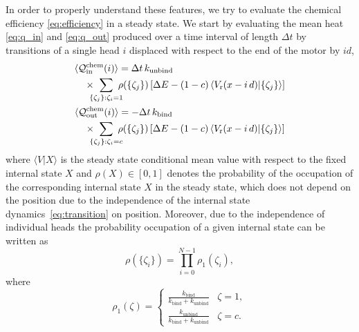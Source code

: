 \documentclass[aps,pre,twocolumn,showpacs,showkeys,superscriptaddress,floatfix]{revtex4-1}
\begin{document}
In order to properly understand these features, 
we try to evaluate the chemical efficiency \eqref{eq:efficiency} in a steady state. 
We start by evaluating the mean heat \eqref{eq:q_in} and \eqref{eq:q_out} produced over a time interval of length $\Delta t$ 
by transitions of a single head $i$ displaced with respect to the end of the motor by $i d$,  
\begin{gather*}
\begin{multlined}[b][.42\textwidth]
\langle \mathcal Q^\text{chem}_\text{in}(i) \rangle 
= \Delta t \, k_\text{unbind} 
\\ \times 
\!\!\!\! \sum\limits_{\{\zeta_j\} : \zeta_i = 1 } \!\!\!\! \rho(\{ \zeta_j \} ) 
\left[ \Delta E - (1-c) \left\langle V_\text{r}(x - i \, d ) \middle| \{ \zeta_j \} \right\rangle \right] 
\end{multlined}
\\
\begin{multlined}[b][.42\textwidth]
\langle \mathcal Q^\text{chem}_\text{out}(i) \rangle 
= - \Delta t \, k_\text{bind} 
\\ \times 
\!\!\!\! \sum\limits_{\{\zeta_j\} : \zeta_i = c } \!\!\!\! \rho(\{ \zeta_j \} ) 
\left[ \Delta E - (1-c) \left\langle V_\text{r}(x - i \, d ) \middle| \{ \zeta_j \} \right\rangle \right] 
\end{multlined}
\end{gather*}
where $\langle V | X \rangle$ is the steady state conditional mean value with respect to the fixed internal state $X$ 
and $\rho(X) \in [0,1]$ denotes the probability of the occupation of the corresponding internal state $X$ in the steady state, 
which does not depend on the position due to the independence of the internal state dynamics~\eqref{eq:transition} on position. 
Moreover, due to the independence of individual heads the probability occupation of a given internal state can be written as 
\[
\rho( \{ \zeta_i \} ) = \prod_{i=0}^{N-1} \rho_1( \zeta_i ), 
\]  
where 
\[
\rho_1(\zeta) = \begin{cases} 
\frac{ k_\text{bind} }{ k_\text{bind} + k_\text{unbind} } & \zeta = 1 , \\
\frac{ k_\text{unbind} }{ k_\text{bind} + k_\text{unbind} } & \zeta = c . 
\end{cases} 
\]
\end{document}
